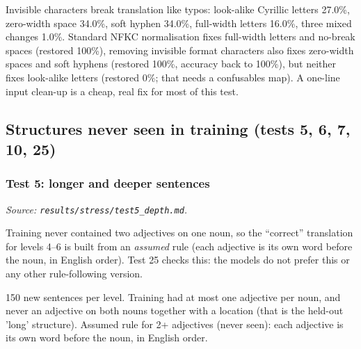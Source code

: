 \documentclass[10pt,a4paper,oneside]{article}
\begin{document}
\begin{infer}Invisible characters break translation like typos: look-alike Cyrillic letters 27.0\%, zero-width space
34.0\%, soft hyphen 34.0\%, full-width letters 16.0\%, three mixed changes 1.0\%. Standard NFKC normalisation fixes
full-width letters and no-break spaces (restored 100\%), removing invisible format characters also fixes zero-width
spaces and soft hyphens (restored 100\%, accuracy back to 100\%), but neither fixes look-alike letters (restored
0\%; that needs a confusables map). A one-line input clean-up is a cheap, real fix for most of this test.\end{infer}
\subsection{Structures never seen in training (tests 5, 6, 7, 10, 25)}
\subsubsection{Test 5: longer and deeper sentences}
\textit{Source: \texttt{results/stress/test5\_depth.md}.}


\begin{caveat}Training never contained two adjectives on one noun, so the ``correct'' translation for levels 4--6 is built
from an \emph{assumed} rule (each adjective is its own word before the noun, in English order). Test 25 checks this:
the models do not prefer this or any other rule-following version.\end{caveat}
150 new sentences per level. Training had at most one adjective per noun, and never an adjective on both nouns together with a location (that is the held-out 'long' structure). Assumed rule for 2+ adjectives (never seen): each adjective is its own word before the noun, in English order.
\end{document}
